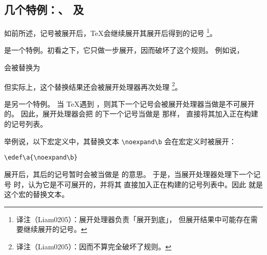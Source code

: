 \documentclass{book}
\begin{document}
\subsection{几个特例：、 及 }

如前所述，记号被展开后，\TeX 会继续展开其展开后得到的记号%
\footnote{译注（Liam0205）：展开处理器负责「展开到底」，
但展开结果中可能存在需要继续展开的记号。}。

 是一个特例。初看之下，它只做一步展开，因而破坏了这个规则。
例如说，
\begin{disp}\end{disp}
会被替换为
\begin{disp}\end{disp}
但实际上，这个替换结果还会被展开处理器再次处理%
\footnote{译注（Liam0205）：因而不算完全破坏了规则。}。

 是另一个特例。
当 \TeX 遇到 ，则其下一个记号会被展开处理器当做是不可展开的。
因此，展开处理器会把  的下一个记号当做是  那样，
直接将其加入正在构建的记号列表。

举例说，以下宏定义中，其替换文本 \verb>\noexpand\b> 会在宏定义时被展开：
\begin{verbatim}
\edef\a{\noexpand\b}
\end{verbatim}
 展开后，其后的记号暂时会被当做是  的意思。
于是，当展开处理器处理下一个记号  时，认为它是不可展开的，并将其
直接加入正在构建的记号列表中。因此  就是这个宏的替换文本。
\end{document}
